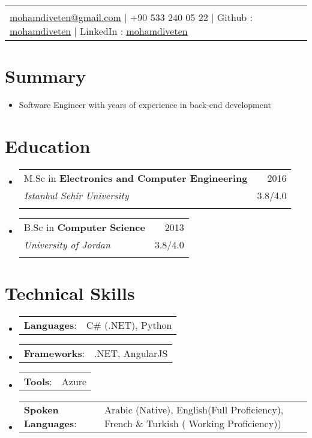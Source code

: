 \documentclass[letterpaper,11pt]{article}
\makeatletter
\newcommand{\sectionStart}{
  \begin{itemize}[label={},leftmargin=0in]
}
\newcommand{\sectionEnd}{
  \end{itemize}
}
\newcommand{\head}[9]{
  \noindent
  \begin{tabular*}{\textwidth}{l@{\extracolsep{\fill}}r}
    \centerline{
      \textbf{\href{#1}{\color{black}{\LARGE {\underline{#2}}}}}
    }
    \vspace{5pt}\\
    \centerline{
      \href{mailto:#3}{\underline{#3}} $\mid$
      #4 $\mid$
      #5 : \href{#6}{\underline{#7}} $\mid$
      #8 : \href{#9}{\underline{#7}}
    }
  \end{tabular*}
  \vspace{-10pt}
}
\newcommand{\summaryText}[1]{
  \item
  \begin{addmargin}[7pt]{0pt}
    {#1}
  \end{addmargin}
}
\newcommand{\educationItem}[5]{
  \vspace{-1pt}
  \item
  \begin{tabular*}{\textwidth}{l@{\extracolsep{\fill}}r@{}}
    {#1 in \textbf{#2}}  & {#3}\\
    {\textit{#4}} & {#5}\\\vspace{-18pt}
  \end{tabular*}
  \vspace{-5pt}
}
\newcommand{\skillItem}[2]{
  \vspace{-1pt}
  \item
  \begin{tabular*}{1.0\textwidth}{l@{}l@{}}
    {\textbf{#1}: } & {#2}
  \end{tabular*}\vspace{-17pt}
}
\makeatother
\begin{document}
\head
  {}
  {Mohamdi Veten}
  {mohamdiveten@gmail.com}
  {+90 533 240 05 22}
  {Github}
  {https://github.com/mohamdiveten}
  {mohamdiveten}
  {LinkedIn}
  {https://www.linkedin.com/in/mohamdi-veten}

\section{Summary}
\sectionStart
  \summaryText
  {Software Engineer with years of experience in back-end development }
\sectionEnd

\section{Education}
\sectionStart
  
    
    \educationItem
    {M.Sc} 
    {Electronics and Computer Engineering} 
    {2016}
    {Istanbul Sehir University} 
    {3.8/4.0}
    
    \educationItem
    {B.Sc} 
    {Computer Science} 
    {2013}
    {University of Jordan} 
    {3.8/4.0}
\sectionEnd


\section{Technical Skills}
\sectionStart
  \skillItem
    {Languages}
    {C\# (.NET), Python}
  \skillItem
    {Frameworks}
    {.NET, AngularJS}
  \skillItem
    {Tools}
    {Azure}
     \skillItem
    {Spoken Languages}
    {Arabic (Native), English(Full Proficiency), French \& Turkish ( Working Proficiency))}
  \vspace{3pt}
\sectionEnd
  
\end{document}
